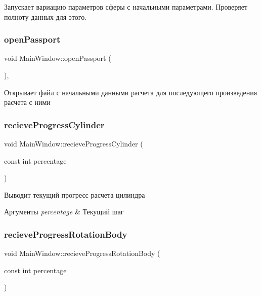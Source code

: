 Запускает вариацию параметров сферы с начальными параметрами. Проверяет полноту данных для этого. \mbox{\label{class_main_window_aa4e061d83c32ac0cd51d12091bd5ce39}} 
\subsubsection{\texorpdfstring{open\+Passport}{openPassport}}
{\footnotesize\ttfamily void Main\+Window\+::open\+Passport (\begin{DoxyParamCaption}{ }\end{DoxyParamCaption})\hspace{0.3cm}{\ttfamily [private]}, {\ttfamily [slot]}}

Открывает файл с начальными данными расчета для последующего произведения расчета с ними \mbox{\label{class_main_window_ae1943ce8bec1cf91611cf6f827f4cc17}} 
\subsubsection{\texorpdfstring{recieve\+Progress\+Cylinder}{recieveProgressCylinder}}
{\footnotesize\ttfamily void Main\+Window\+::recieve\+Progress\+Cylinder (\begin{DoxyParamCaption}\item[{const int}]{percentage }\end{DoxyParamCaption})\hspace{0.3cm}{\ttfamily [slot]}}

Выводит текущий прогресс расчета цилиндра 
\begin{DoxyParams}{Аргументы}
{\em percentage} & Текущий шаг \\
\hline
\end{DoxyParams}
\mbox{\label{class_main_window_ad5d102e64cec9e823e16c76097a82e67}} 
\subsubsection{\texorpdfstring{recieve\+Progress\+Rotation\+Body}{recieveProgressRotationBody}}
{\footnotesize\ttfamily void Main\+Window\+::recieve\+Progress\+Rotation\+Body (\begin{DoxyParamCaption}\item[{const int}]{percentage }\end{DoxyParamCaption})\hspace{0.3cm}{\ttfamily [slot]}}

